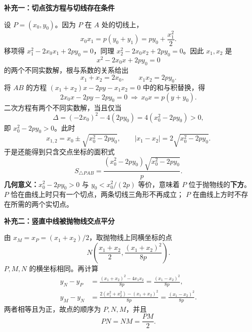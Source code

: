 \begin{proofbox}
    \medskip
    \par\noindent\begin{minipage}{\linewidth}
    \textbf{\textcolor{CProof}{补充一：切点弦方程与切线存在条件}}

    
    \end{minipage}\par

    设 $P=(x_0,y_0)$。因为 $P$ 在 $A$ 处的切线上，
    \[
        x_0x_1=p(y_0+y_1)
        =py_0+\frac{x_1^2}{2}.
    \]
    移项得 $x_1^2-2x_0x_1+2py_0=0$，同理
    $x_2^2-2x_0x_2+2py_0=0$。因此 $x_1,x_2$ 是
    \[
        \boxed{x^2-2x_0x+2py_0=0}
    \]
    的两个不同实数解，根与系数的关系给出
    \[
        x_1+x_2=2x_0,\qquad x_1x_2=2py_0.
    \]
    将 $AB$ 的方程
    $(x_1+x_2)x-2py-x_1x_2=0$ 中的和与积替换，得
    \[
        2x_0x-2py-2py_0=0
        \ \Longrightarrow\ \boxed{x_0x=p(y+y_0)}.
    \]
    二次方程有两个不同实数解，当且仅当
    \[
        \Delta=(-2x_0)^2-4(2py_0)
        =4(x_0^2-2py_0)>0,
    \]
    即 $x_0^2-2py_0>0$。此时
    \[
        x_{1,2}=x_0\pm\sqrt{x_0^2-2py_0},
        \qquad |x_1-x_2|=2\sqrt{x_0^2-2py_0}.
    \]
    于是还能得到只含交点坐标的面积式
    \[
        \boxed{S_{\triangle PAB}
        =\frac{(x_0^2-2py_0)\sqrt{x_0^2-2py_0}}{p}}.
    \]
    \textbf{几何意义：}$x_0^2-2py_0>0$ 与
    $y_0<x_0^2/(2p)$ 等价，意味着 $P$ 位于抛物线的\textbf{下方}。
    $P$ 恰在曲线上时只有一个切点，两条切线三角形不再成立；
    $P$ 在曲线上方时不存在所需的两个实切点。

    \medskip
    \par\noindent\begin{minipage}{\linewidth}
    \textbf{\textcolor{CProof}{补充二：竖直中线被抛物线交点平分}}

    
    \end{minipage}\par

    由 $x_M=x_P=(x_1+x_2)/2$，取抛物线上同横坐标的点
    \[
        N\left(\frac{x_1+x_2}{2},\frac{(x_1+x_2)^2}{8p}\right).
    \]
    $P,M,N$ 的横坐标相同。再计算
    \[
    \begin{aligned}
        y_N-y_P
        &=\frac{(x_1+x_2)^2-4x_1x_2}{8p}
          =\frac{(x_1-x_2)^2}{8p},\\
        y_M-y_N
        &=\frac{2(x_1^2+x_2^2)-(x_1+x_2)^2}{8p}
          =\frac{(x_1-x_2)^2}{8p}.
    \end{aligned}
    \]
    两者相等且为正，故点的顺序为 $P,N,M$，并且
    \[
        \boxed{PN=NM=\frac{PM}{2}}.
    \]


\end{proofbox}
